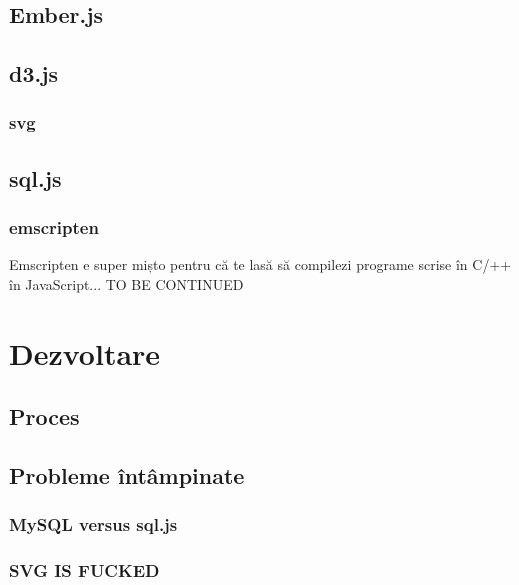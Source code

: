 \documentclass[12pt, a4paper, twoside, romanian]{teza-upb}
\begin{document}
    \subsection{Ember.js}
    \subsection{d3.js}
      \subsubsection{svg}
    \subsection{sql.js}
      \subsubsection{emscripten}
        Emscripten e super mișto pentru că te lasă să compilezi programe scrise în C/++ în JavaScript... TO BE CONTINUED

  \section{Dezvoltare}

    \subsection{Proces}

    \subsection{Probleme întâmpinate}
      \subsubsection{MySQL versus sql.js} %
      \label{ssub:MySQL versus sql.js}

      \subsubsection{SVG IS FUCKED}



\appendix
\end{document}

